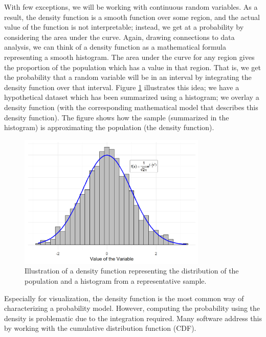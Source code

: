 \documentclass[
]{book}
\theoremstyle{plain}
\theoremstyle{mydefn}
\theoremstyle{myexmpl}
\theoremstyle{remark}
\begin{document}
With few exceptions, we will be working with continuous random variables. As a result, the density function is a smooth function over some region, and the actual value of the function is not interpretable; instead, we get at a probability by considering the area under the curve. Again, drawing connections to data analysis, we can think of a density function as a mathematical formula representing a smooth histogram. The area under the curve for any region gives the proportion of the population which has a value in that region. That is, we get the probability that a random variable will be in an interval by integrating the density function over that interval. Figure \ref{fig:essential-probability-density} illustrates this idea; we have a hypothetical dataset which has been summarized using a histogram; we overlay a density function (with the corresponding mathematical model that describes this density function). The figure shows how the sample (summarized in the histogram) is approximating the population (the density function).

\begin{figure}

{\centering \includegraphics[width=0.8\textwidth]{./Images/essential-probability-density-1} 

}

\caption{Illustration of a density function representing the distribution of the population and a histogram from a representative sample.}\label{fig:essential-probability-density}
\end{figure}

Especially for visualization, the density function is the most common way of characterizing a probability model. However, computing the probability using the density is problematic due to the integration required. Many software address this by working with the cumulative distribution function (CDF).
\end{document}
